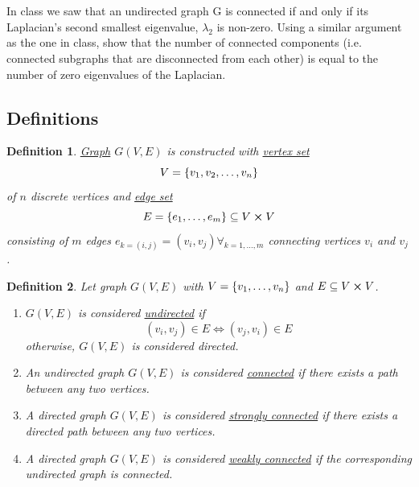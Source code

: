 \documentclass[]{article}
\numberwithin{equation}{section}
\newtheorem{definition}{Definition}
\begin{document}
\newpage
\section{}
In class we saw that an undirected graph G is connected if and only if its Laplacian’s second smallest eigenvalue, $\lambda_2$ is non-zero. 
Using a similar argument as the one in class, show that the number of connected components (i.e. connected subgraphs that are disconnected from each other) is equal to the number of zero eigenvalues of the Laplacian.

\subsection{Definitions}
\begin{definition} \label{def:graph_def}
	\underline{\emph{Graph}} $G(V,E)$ is constructed with \underline{\emph{vertex set}} \[
		V = \qty{v_1,v_2,\dots,v_n}
	\] of $n$ discrete vertices and \emph{\underline{edge set}} \[
		E = \qty{e_1, \dots, e_m} \subseteq V \cross V
	\] consisting of $m$ edges $e_{k=(i,j)} = (v_i,v_j) \forall_{k=1,\dots,m}$ connecting vertices $v_i$ and $v_j$.
\end{definition}

\begin{definition} \label{def:graph_properties}
	Let graph $G(V,E)$ with $V = \qty{v_1,\dots,v_n}$ and $E \subseteq V \cross V$.
	\begin{enumerate}
		\item $G(V,E)$ is considered \underline{\emph{undirected}} if\[
			(v_i,v_j) \in E \iff (v_j,v_i) \in E
		\] otherwise, $G(V,E)$ is considered \emph{directed}.
		\item An undirected graph $G(V,E)$ is considered \underline{\emph{connected}} if there exists a path between any two vertices.
		\item A directed graph $G(V,E)$ is considered \underline{\emph{strongly connected}} if there exists a directed path between any two vertices.
		\item A directed graph $G(V,E)$ is considered \underline{\emph{weakly connected}} if the corresponding undirected graph is connected.
	\end{enumerate}
\end{definition}
\end{document}
